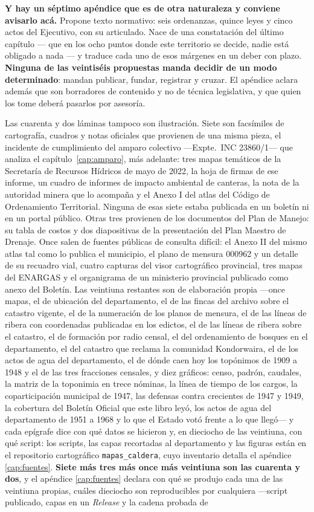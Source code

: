 \textbf{Y hay un séptimo apéndice que es de otra naturaleza y conviene avisarlo acá.} Propone texto
normativo: seis ordenanzas, quince leyes y cinco actos del Ejecutivo, con su articulado. Nace
de una constatación del último capítulo --- que en los ocho puntos donde este territorio se
decide, nadie está obligado a nada --- y traduce cada uno de esos márgenes en un deber con
plazo. \textbf{Ninguna de las veintiséis propuestas manda decidir de un modo determinado}: mandan
publicar, fundar, registrar y cruzar. El apéndice aclara además que son borradores de
contenido y no de técnica legislativa, y que quien los tome deberá pasarlos por asesoría. 

Las cuarenta y dos láminas tampoco son ilustración. Siete son facsímiles de cartografía, cuadros y notas oficiales que provienen de una misma pieza, el incidente de cumplimiento del amparo colectivo ---Expte.\ INC 23860/1--- que analiza el capítulo~\ref{cap:amparo}, más adelante: tres mapas temáticos de la Secretaría de Recursos Hídricos de mayo de 2022, la hoja de firmas de ese informe, un cuadro de informes de impacto ambiental de canteras, la nota de la autoridad minera que lo acompaña y el Anexo I del atlas del Código de Ordenamiento Territorial. Ninguna de esas siete estaba publicada en un boletín ni en un portal público. Otras tres provienen de los documentos del Plan de Manejo: su tabla de costos y dos diapositivas de la presentación del Plan Maestro de Drenaje. Once salen de fuentes públicas de consulta difícil: el Anexo II del mismo atlas tal como lo publica el municipio, el plano de mensura 000962 y un detalle de su recuadro vial, cuatro capturas del visor cartográfico provincial, tres mapas del ENARGAS y el organigrama de un ministerio provincial publicado como anexo del Boletín. Las veintiuna restantes son de elaboración propia ---once mapas, el de ubicación del departamento, el de las fincas del archivo sobre el catastro vigente, el de la numeración de los planos de mensura, el de las líneas de ribera con coordenadas publicadas en los edictos, el de las líneas de ribera sobre el catastro, el de formación por radio censal, el del ordenamiento de bosques en el departamento, el del catastro que reclama la comunidad Kondorwaira, el de los actos de agua del departamento, el de dónde caen hoy los topónimos de 1909 a 1948 y el de las tres fracciones censales, y diez gráficos: censo, padrón, caudales, la matriz de la toponimia en trece nóminas, la línea de tiempo de los cargos, la coparticipación municipal de 1947, las defensas contra crecientes de 1947 y 1949, la cobertura del Boletín Oficial que este libro leyó, los actos de agua del departamento de 1951 a 1968 y lo que el Estado votó frente a lo que llegó--- y cada epígrafe dice con qué datos se hicieron y, en dieciocho de las veintiuna, con qué script: los scripts, las capas recortadas al departamento y las figuras están en el repositorio cartográfico \texttt{mapas\_caldera}, cuyo inventario detalla el apéndice \ref{cap:fuentes}. \textbf{Siete más tres más once más veintiuna son las cuarenta y dos}, y el apéndice \ref{cap:fuentes} declara con qué se produjo cada una de las veintiuna propias, cuáles dieciocho son reproducibles por cualquiera ---script publicado, capas en un \textit{Release} y la cadena probada de 